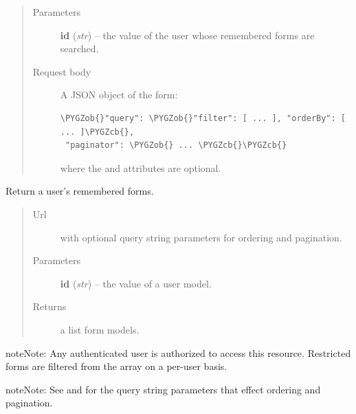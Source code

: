 \documentclass[letterpaper,10pt,english]{sphinxmanual}
\def\PYGZob{\char`\{}
\def\PYGZcb{\char`\}}
\begin{document}
\begin{fulllineitems}
\begin{fulllineitems}
\begin{quote}
\begin{description}
\item[{Parameters}] \leavevmode
\textbf{id} (\emph{str}) -- the  value of the user whose remembered forms are searched.

\item[{Request body}] \leavevmode
A JSON object of the form:

\begin{Verbatim}[commandchars=\\\{\}]
\PYGZob{}"query": \PYGZob{}"filter": [ ... ], "orderBy": [ ... ]\PYGZcb{},
 "paginator": \PYGZob{} ... \PYGZcb{}\PYGZcb{}
\end{Verbatim}

where the  and  attributes are optional.

\end{description}\end{quote}

\end{fulllineitems}


\begin{fulllineitems}
\label{api:onlinelinguisticdatabase.controllers.rememberedforms.RememberedformsController.show}
Return a user's remembered forms.
\begin{quote}\begin{description}
\item[{Url }] \leavevmode
{} with optional query string parameters
for ordering and pagination.

\item[{Parameters}] \leavevmode
\textbf{id} (\emph{str}) -- the  value of a user model.

\item[{Returns}] \leavevmode
a list form models.

\end{description}\end{quote}

\begin{notice}{note}{Note:}
Any authenticated user is authorized to access this resource.
Restricted forms are filtered from the array on a per-user basis.
\end{notice}

\begin{notice}{note}{Note:}
See  and  for the
query string parameters that effect ordering and pagination.
\end{notice}


\end{fulllineitems}
\end{fulllineitems}
\end{document}
